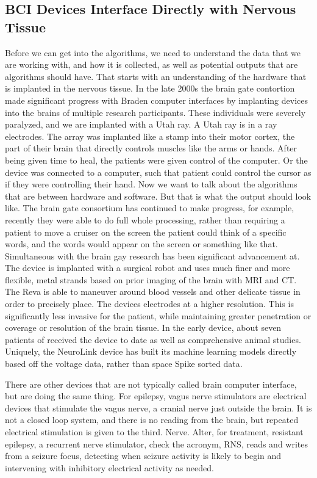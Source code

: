 \documentclass[11pt]{article}
\newcommand{\subsectionwithindent}[1]{
    \subsection*{#1}
    \hspace{\parindent} %
}
\begin{document}
\subsectionwithindent{BCI Devices Interface Directly with Nervous Tissue}
Before we can get into the algorithms, we need to understand the data that we are working with, and how it is collected, as well as potential outputs that are algorithms should have. That starts with an understanding of the hardware that is implanted in the nervous tissue. In the late 2000s the brain gate contortion made significant progress with Braden computer interfaces by implanting devices into the brains of multiple research participants. These individuals were severely paralyzed, and we are implanted with a Utah ray. A Utah ray is in a ray electrodes. The array was implanted like a stamp into their motor cortex, the part of their brain that directly controls muscles like the arms or hands. After being given time to heal, the patients were given control of the computer. Or the device was connected to a computer, such that patient could control the cursor as if they were controlling their hand. Now we want to talk about the algorithms that are between hardware and software. But that is what the output should look like. The brain gate consortium has continued to make progress, for example, recently they were able to do full whole processing, rather than requiring a patient to move a cruiser on the screen the patient could think of a specific words, and the words would appear on the screen or something like that. Simultaneous with the brain gay research has been significant advancement at. The device is implanted with a surgical robot and uses much finer and more flexible, metal strands based on prior imaging of the brain with MRI and CT. The Reva is able to maneuver around blood vessels and other delicate tissue in order to precisely place. The devices electrodes at a higher resolution. This is significantly less invasive for the patient, while maintaining greater penetration or coverage or resolution of the brain tissue. In the early device, about seven patients of received the device to date as well as comprehensive animal studies. Uniquely, the NeuroLink device has built its machine learning models directly based off the voltage data, rather than space Spike sorted data.

There are other devices that are not typically called brain computer interface, but are doing the same thing. For epilepsy, vagus nerve stimulators are electrical devices that stimulate the vagus nerve, a cranial nerve just outside the brain. It is not a closed loop system, and there is no reading from the brain, but repeated electrical stimulation is given to the third. Nerve. Alter, for treatment, resistant epilepsy, a recurrent nerve stimulator, check the acronym, RNS, reads and writes from a seizure focus, detecting when seizure activity is likely to begin and intervening with inhibitory electrical activity as needed.
\end{document}
